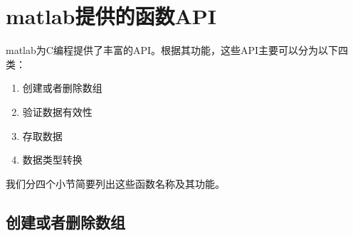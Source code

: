 \documentclass[10pt,a4paper,UTF8]{article}
\begin{document}
\section{matlab提供的函数API}
\label{sec:orgheadline7}


matlab为C编程提供了丰富的API。根据其功能，这些API主要可以分为以下四类：
\begin{enumerate}
\item 创建或者删除数组
\item 验证数据有效性
\item 存取数据
\item 数据类型转换
\end{enumerate}

我们分四个小节简要列出这些函数名称及其功能。

\subsection{创建或者删除数组}
\label{sec:orgheadline3}
\end{document}
